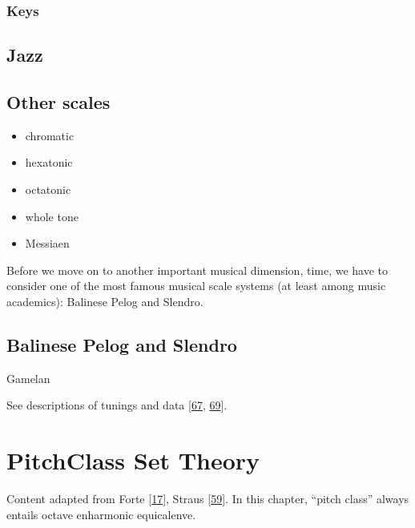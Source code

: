 \documentclass[letterpaper,10pt,english]{sphinxmanual}
\begin{document}
\subsection{Keys}
\label{\detokenize{2_scales_modes:keys}}

\section{Jazz}
\label{\detokenize{2_scales_modes:jazz}}

\section{Other scales}
\label{\detokenize{2_scales_modes:other-scales}}\begin{itemize}
\item {} 
\sphinxAtStartPar
chromatic

\item {} 
\sphinxAtStartPar
hexatonic

\item {} 
\sphinxAtStartPar
octatonic

\item {} 
\sphinxAtStartPar
whole tone

\item {} 
\sphinxAtStartPar
Messiaen

\end{itemize}

\sphinxAtStartPar
Before we move on to another important musical dimension, time, we have to consider
one of the most famous musical scale systems (at least among music academics): Balinese Pelog and Slendro.


\section{Balinese Pelog and Slendro}
\label{\detokenize{2_scales_modes:balinese-pelog-and-slendro}}
\sphinxAtStartPar
Gamelan

\sphinxAtStartPar
See descriptions of tunings 
and data 
{[}\hyperlink{cite.8_bibliography:id35}{67}, \hyperlink{cite.8_bibliography:id36}{69}{]}.


\chapter{Pitch\sphinxhyphen{}Class Set Theory}
\label{\detokenize{3_set_theory:pitch-class-set-theory}}\label{\detokenize{3_set_theory::doc}}
\sphinxAtStartPar
Content adapted from Forte {[}\hyperlink{cite.8_bibliography:id25}{17}{]}, Straus {[}\hyperlink{cite.8_bibliography:id3}{59}{]}.
In this chapter, “pitch class” always entails octave  enharmonic equicalenve.
\end{document}
